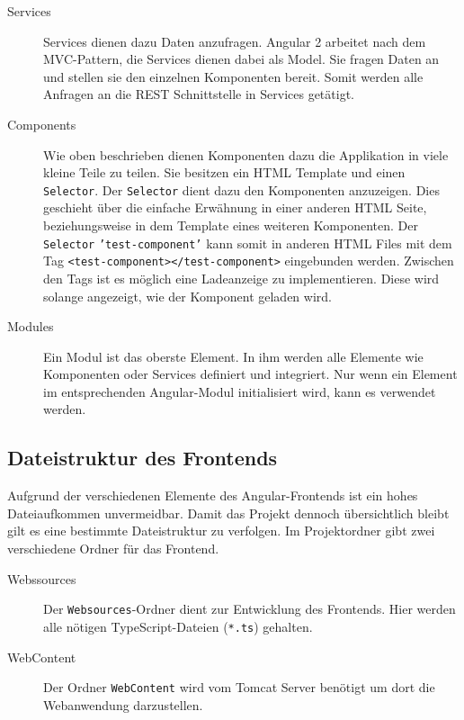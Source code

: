 \begin{description}
	\item[Services] Services dienen dazu Daten anzufragen. Angular 2 arbeitet nach dem \ac{MVC}-Pattern, die Services dienen dabei als Model. Sie fragen Daten an und stellen sie den einzelnen Komponenten bereit. Somit werden alle Anfragen an die REST Schnittstelle in Services getätigt.
	\item[Components] Wie oben beschrieben dienen Komponenten dazu die Applikation in viele kleine Teile zu teilen. Sie besitzen ein HTML Template und einen \texttt{Selector}. Der \texttt{Selector} dient dazu den Komponenten anzuzeigen. Dies geschieht über die einfache Erwähnung in einer anderen HTML Seite, beziehungsweise in dem Template eines weiteren Komponenten. Der \texttt{Selector} \texttt{'test-component'} kann somit in anderen HTML Files mit dem Tag \texttt{<test-component></test-component>} eingebunden werden. Zwischen den Tags ist es möglich eine Ladeanzeige zu implementieren. Diese wird solange angezeigt, wie der Komponent geladen wird.
	\item[Modules] Ein Modul ist das oberste Element. In ihm werden alle Elemente wie Komponenten oder Services definiert und integriert. Nur wenn ein Element im entsprechenden Angular-Modul initialisiert wird, kann es verwendet werden.
\end{description}


\subsection{Dateistruktur des Frontends}

Aufgrund der verschiedenen Elemente des Angular-Frontends ist ein hohes Dateiaufkommen unvermeidbar. Damit das Projekt dennoch übersichtlich bleibt gilt es eine bestimmte Dateistruktur zu verfolgen. Im Projektordner gibt zwei verschiedene Ordner für das Frontend. 
\begin{description}
	\item[Webssources] Der \texttt{Websources}-Ordner dient zur Entwicklung des Frontends. Hier werden alle nötigen TypeScript-Dateien (\texttt{*.ts}) gehalten. 
	\item[WebContent] Der Ordner \texttt{WebContent} wird vom Tomcat Server benötigt um dort die Webanwendung darzustellen.
\end{description}


